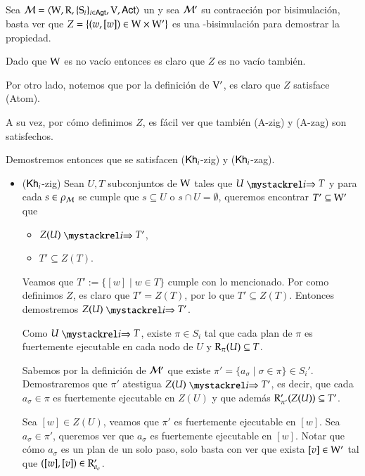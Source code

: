\begin{demostracion}
    Sea $\mathcal{M}=\langle \mathrm{W},\mathrm{R},\{ \mathrm{S}_i \}_{i \in {\rm \sf Agt}},\mathrm{V},{\rm \sf Act} \rangle$ un \ults
    y sea $\mathcal{M}'$ su contracción por bisimulación, basta ver que $Z = \{(w,[w]) \in \mathrm{W} \times\mathrm{W}'\}$ es una \KHilogic-bisimulación para demostrar la propiedad.

    Dado que $\mathrm{W}$ es no vacío entonces es claro que $Z$ es no vacío también.

    Por otro lado, notemos que por la definición de $\mathrm{V}'$, es claro que $Z$ satisface (Atom).

    A su vez, por cómo definimos $Z$, es fácil ver que también (A-zig) y (A-zag) son satisfechos.
    
    Demostremos entonces que se satisfacen ($\mathsf{Kh}_i$-zig) y ($\mathsf{Kh}_i$-zag).

    \begin{itemize}
        \item ($\mathsf{Kh}_i$-zig) Sean $U, T$ subconjuntos de $\mathrm{W}$ tales que $U \ultsExecAgi T$ y para cada $s \in \rho_{\mathcal{M}}$ se cumple que 
        $s \subseteq U$ o $s \cap U = \emptyset$, queremos encontrar $T' \subseteq \mathrm{W}'$ que

        \begin{multicols}{2}
            \begin{itemize}
                \item $Z(U) \ultsExecAgi T'$, 
                \item $T' \subseteq Z(T)$.
            \end{itemize}
        \end{multicols}

        Veamos que $T' := \{ [w] \mid w \in T\}$ cumple con lo mencionado. Por como definimos $Z$, es claro que $T'  = Z(T)$, por lo que 
        $T' \subseteq Z(T)$. Entonces demostremos $Z(U) \ultsExecAgi T'$.

        Como $U \ultsExecAgi T$, existe $\pi \in S_i$ tal que cada plan de $\pi$ es fuertemente ejecutable en cada nodo de $U$ y 
        $\mathrm{R}_\pi(U) \subseteq T$. 

        Sabemos por la definición de $\mathcal{M}'$ que existe $\pi' = \{a_\sigma \mid \sigma \in \pi\} \in S_i'$. Demostraremos que $\pi'$ 
        atestigua $Z(U) \ultsExecAgi T'$, es decir, que cada $a_\sigma \in \pi$ es fuertemente ejecutable en $Z(U)$ y que además 
        $\mathrm{R}'_{\pi'}(Z(U)) \subseteq T'$.

        Sea $[w] \in Z(U)$, veamos que $\pi'$ es fuertemente ejecutable en $[w]$. Sea $a_\sigma \in \pi'$, queremos ver que $a_\sigma$ es fuertemente 
        ejecutable en $[w]$. Notar que cómo $a_\sigma$ es un plan de un solo paso, solo basta con ver que exista $[v] \in \mathrm{W}'$  tal que 
        $([w],[v]) \in \mathrm{R}'_{a_\sigma}$.
        

\end{itemize}
\end{demostracion}
